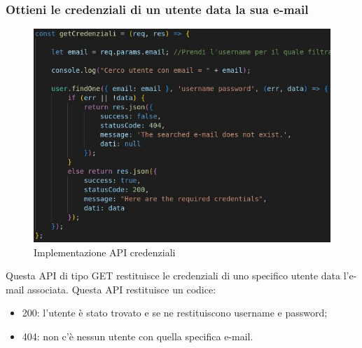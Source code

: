 \subsubsection{Ottieni le credenziali di un utente data la sua e-mail}
\begin{figure}[!h]
\centering
\includegraphics[scale=0.4]{images/api_credenziali.jpg}
\caption{Implementazione API credenziali}
\label{fig:api_credenziali}
\end{figure}
\noindent
Questa API di tipo GET restituisce le credenziali di uno specifico utente data l'e-mail associata.
Questa API restituisce un codice:
\begin{itemize}
    \item 200: l'utente è stato trovato e se ne restituiscono username e password;
    \item 404: non c'è nessun utente con quella specifica e-mail.
\end{itemize}

